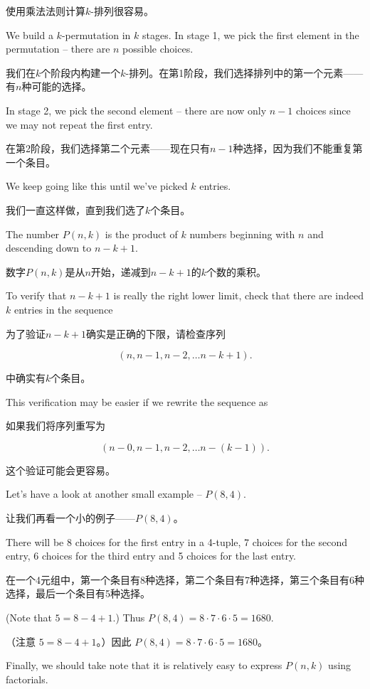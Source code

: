 使用乘法法则计算$k$-排列很容易。

We
build a $k$-permutation in $k$ stages.  In stage 1, we pick the first 
element in the permutation -- there are $n$ possible choices.

我们在$k$个阶段内构建一个$k$-排列。在第1阶段，我们选择排列中的第一个元素——有$n$种可能的选择。

In
stage 2, we pick the second element -- there are now only $n-1$ choices
since we may not repeat the first entry.

在第2阶段，我们选择第二个元素——现在只有$n-1$种选择，因为我们不能重复第一个条目。

We keep going like this until 
we've picked $k$ entries.

我们一直这样做，直到我们选了$k$个条目。

The number $P(n,k)$ is the product of $k$
numbers beginning with $n$ and descending down to $n-k+1$.

数字$P(n,k)$是从$n$开始，递减到$n-k+1$的$k$个数的乘积。

To verify 
that $n-k+1$ is really the right lower limit, check that there are indeed
$k$ entries in the sequence

为了验证$n-k+1$确实是正确的下限，请检查序列

\[ (n, n-1, n-2, \ldots n-k+1). \]

中确实有$k$个条目。

This verification may be easier if we rewrite the sequence as

如果我们将序列重写为

\[ (n-0, n-1, n-2, \ldots n-(k-1) ). \]

这个验证可能会更容易。

Let's have a look at another small example -- $P(8,4)$.

让我们再看一个小的例子——$P(8,4)$。

There will be 8
choices for the first entry in a 4-tuple, 7 choices for the second
entry, 6 choices for the third entry and 5 choices for the last entry.

在一个4元组中，第一个条目有8种选择，第二个条目有7种选择，第三个条目有6种选择，最后一个条目有5种选择。

(Note that $5 = 8-4+1$.)  Thus $P(8,4)=8\cdot 7 \cdot 6 \cdot 5 = 1680$.

（注意 $5 = 8-4+1$。）因此 $P(8,4)=8\cdot 7 \cdot 6 \cdot 5 = 1680$。

Finally, we should take note that it is relatively easy to express $P(n,k)$
using factorials.

